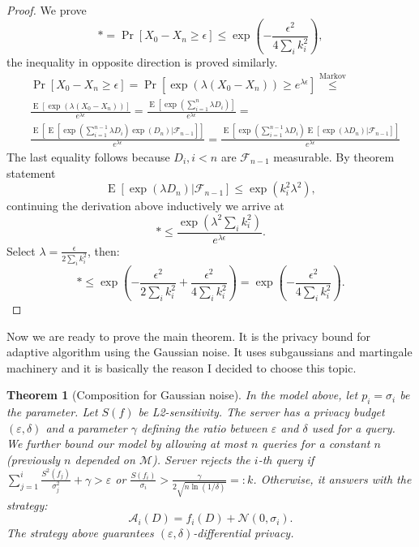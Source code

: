 \documentclass[12pt,letterpaper]{article}
\let\eps\varepsilon
\newcommand{\E}{\operatorname{E}}
\newtheorem{theorem}{Theorem}
\newcommand{\No}{\mathcal{N}}
\begin{document}
\begin{proof}
  We prove
  $$* = \Pr[X_0 - X_{n}\geq \epsilon] \leq \exp\left(-\frac{\epsilon^2}{4\sum_{i}k_i^2}\right),$$
  the inequality in opposite direction is proved similarly.
  \begin{align*}&\Pr[X_0 - X_{n}\geq \epsilon] = \Pr[\exp(\lambda(X_0 - X_{n}))\geq e^{\lambda\epsilon}] \overset{\text{Markov}}{\leq}\\
  &\frac{\E[\exp(\lambda(X_0 - X_{n}))]}{e^{\lambda\epsilon}} = 
  \frac{\E[\exp(\sum_{i=1}^{n}\lambda D_i)]}{e^{\lambda\epsilon}} = \\
  &\frac{\E[\E[\exp\left(\sum_{i=1}^{n-1}\lambda D_i\right)\exp\left(D_n\right)| \mathcal{F}_{n - 1}]]}{e^{\lambda\epsilon}} = \frac{\E[\exp\left(\sum_{i=1}^{n-1}\lambda D_i\right)\E[\exp\left(\lambda D_n\right)| \mathcal{F}_{n - 1}]]}{e^{\lambda\epsilon}}
  \end{align*}
  The last equality follows because $D_i, i < n$ are $\mathcal{F}_{n - 1}$ measurable. By theorem statement
 $$\E[\exp\left(\lambda D_n\right)| \mathcal{F}_{n - 1}] \leq \exp(k_i^2\lambda^2),$$ continuing the derivation above inductively we arrive at 
 $$* \leq \frac{\exp\left(\lambda^2 \sum_{i}k_i^2\right)}{e^{\lambda \epsilon}}.$$
Select $\lambda = \frac{\epsilon}{2\sum_{i}k_i^2}$, then:
$$* \leq \exp\left(-\frac{\epsilon^2}{2\sum_{i}k_i^2} + \frac{\epsilon^2}{4\sum_{i}k_i^2}\right) = \exp\left(-\frac{\epsilon^2}{4\sum_{i}k_i^2}\right).$$
\end{proof}
Now we are ready to prove the main theorem. It is the privacy bound for adaptive algorithm using the Gaussian noise. It uses subgaussians and martingale machinery and it is basically the reason I decided to choose this topic.
\begin{theorem}[Composition for Gaussian noise]
  \label{thm:adapt_gaussian}
In the model above, let $p_i = \sigma_i$ be the parameter. Let $S(f)$ be L2-sensitivity. The server has a privacy budget $(\eps, \delta)$ and a parameter $\gamma$ defining the ratio between $\eps$ and $\delta$ used for a query. We further bound our model by allowing at most $n$ queries for a constant $n$ (previously $n$ depended on $\mathcal{M}$). Server rejects the $i$-th query if $\sum_{j=1}^{i}\frac{S^2(f_j)}{\sigma_j^2} + \gamma > \eps$ or $\frac{S(f_i)}{\sigma_i} > \frac{\gamma}{2\sqrt{n \ln (1/\delta)}} =: k$. Otherwise, it answers with the strategy:
$$\mathcal{A}_i(D) = f_{i}(D) + \No(0, \sigma_i).$$
The strategy above guarantees $(\eps, \delta)$-differential privacy.
\end{theorem}
\end{document}
